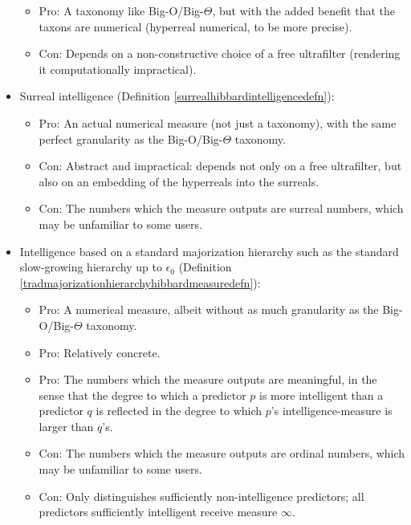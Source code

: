 \documentclass{article}
\begin{document}
\begin{itemize}
\begin{itemize}
        \item
        Pro: A taxonomy like Big-O/Big-$\Theta$, but with the added benefit
        that the taxons are numerical (hyperreal numerical, to be more precise).
        \item
        Con: Depends on a non-constructive choice of a free ultrafilter (rendering it
        computationally impractical).
    \end{itemize}
    \item
    Surreal intelligence (Definition \ref{surrealhibbardintelligencedefn}):
    \begin{itemize}
        \item
        Pro: An actual numerical measure (not just a taxonomy), with the same perfect
        granularity as the Big-O/Big-$\Theta$ taxonomy.
        \item
        Con: Abstract and impractical: depends not only on
        a free ultrafilter, but also on an embedding of the hyperreals into the surreals.
        \item
        Con: The numbers which the measure outputs are surreal numbers, which may be
        unfamiliar to some users.
    \end{itemize}
    \item
    Intelligence based on a standard majorization hierarchy such as the
    standard slow-growing hierarchy up to $\epsilon_0$
    (Definition \ref{tradmajorizationhierarchyhibbardmeasuredefn}):
    \begin{itemize}
        \item
        Pro: A numerical measure, albeit without as much granularity as the
        Big-O/Big-$\Theta$ taxonomy.
        \item
        Pro: Relatively concrete.
        \item
        Pro: The numbers which the measure outputs are meaningful, in the sense that
        the degree to which a predictor $p$ is more intelligent than a
        predictor $q$ is reflected
        in the degree to which $p$'s intelligence-measure is larger than $q$'s.
        \item
        Con: The numbers which the measure outputs are ordinal numbers, which may be
        unfamiliar to some users.
        \item
        Con: Only distinguishes sufficiently non-intelligence predictors; all predictors
        sufficiently intelligent receive measure $\infty$.
    \end{itemize}
\end{itemize}
\end{document}
